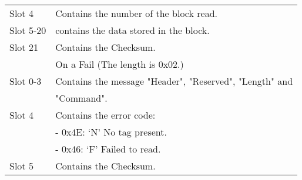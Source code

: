 \begin{tabular}{|l|l|}
Slot 4 & Contains the number of the block read. \\
Slot 5-20 & contains the data stored in the block.\\
Slot 21 & Contains the Checksum.\\
\hline
&On a Fail (The length is 0x02.)\\
\hline
Slot 0-3 & Contains the message "Header", "Reserved", "Length" and\\
& "Command".\\
Slot 4 & Contains the error code:\\
& \indent - 0x4E: `N' No tag present.\\
& \indent - 0x46: `F' Failed to read.\\
Slot 5 & Contains the Checksum.\\
\hline
\end{tabular}